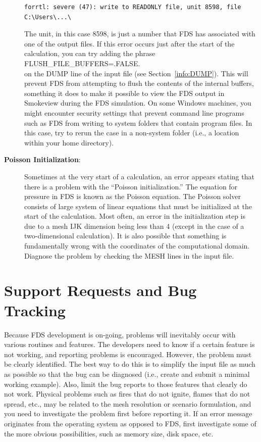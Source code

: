 \documentclass[11pt]{book}
\begin{document}
\begin{description}
\begin{lstlisting}
forrtl: severe (47): write to READONLY file, unit 8598, file C:\Users\...\
\end{lstlisting}
 The unit, in this case 8598, is just a number that FDS has associated with one of the output files. If this error occurs just after the start of the calculation, you can try adding the phrase \\ {\ct FLUSH\_FILE\_BUFFERS=.FALSE.} \\ on the {\ct DUMP} line of the input file (see Section~\ref{info:DUMP}). This will prevent FDS from attempting to flush the contents of the internal buffers, something it does to make it possible to view the FDS output in Smokeview during the FDS simulation. On some Windows machines, you might encounter security settings that prevent command line programs such as FDS from writing to system folders that contain program files. In this case, try to rerun the case in a non-system folder (i.e., a location within your home directory).
\item[{\bf Poisson Initialization}:] Sometimes at the very start of a calculation, an error appears stating that there is a problem with the ``Poisson initialization.'' The equation for pressure in FDS is known as the Poisson equation. The Poisson solver consists of large system of linear equations that must be initialized at the start of the calculation. Most often, an error in the initialization step is due to a mesh {\ct IJK} dimension being less than 4 (except in the case of a two-dimensional calculation). It is also possible that something is fundamentally wrong with the coordinates of the computational domain. Diagnose the problem by checking the {\ct MESH} lines in the input file.
\end{description}


\section{Support Requests and Bug Tracking}

Because FDS development is on-going, problems will inevitably occur
with various routines and features. The developers need to know if a certain
feature is not working, and reporting problems is encouraged. However, the
problem must be clearly identified. The best way to do this is to simplify
the input file as much as possible so that the bug can be diagnosed
(i.e., create and submit a minimal working example).
Also, limit the bug reports to those features that clearly do not work.
Physical problems such as fires that do not ignite, flames that do not
spread, etc., may be related to the mesh resolution or scenario
formulation, and you need to investigate the problem first before
reporting it. If an error message originates from the operating system as
opposed to FDS, first investigate some of the more obvious possibilities,
such as memory size, disk space, etc.
\end{document}
